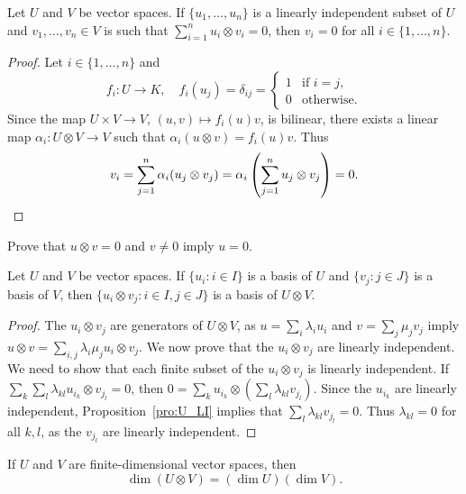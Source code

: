 \begin{proposition}
	\label{pro:U_LI}
	Let $U$ and $V$ be vector spaces. 
	If $\{u_1,\dots,u_n\}$ is a linearly independent subset of $U$ and 
	$v_1,\dots,v_n\in V$ is such that $\sum_{i=1}^n u_i\otimes v_i=0$, then 
    $v_i=0$ for all $i\in\{1,\dots,n\}$.
\end{proposition}

\begin{proof}
	Let $i\in\{1,\dots,n\}$ and 
	\[
	f_i\colon U\to K,
	\quad
	f_i(u_j)=\delta_{ij}=\begin{cases}
	1 & \text{if $i=j$},\\
	0 & \text{otherwise}.
	\end{cases}
	\]
	Since the map $U\times V\to V$, $(u,v)\mapsto f_i(u)v$, is bilinear, there exists 
	a linear map 
	$\alpha_i\colon U\otimes V\to V$ such that $\alpha_i(u\otimes
	v)=f_i(u)v$. Thus
	\[
		v_i=\sum_{j=1}^n\alpha_i(u_j\otimes v_j)=\alpha_i\left(\sum_{j=1}^nu_j\otimes v_j\right)=0.\qedhere
	\]
\end{proof}

\begin{exercise}
	\label{xca:uxv=0}
	Prove that $u\otimes v=0$ and $v\ne 0$ imply $u=0$.
\end{exercise}

\begin{theorem}
    Let $U$ and $V$ be vector spaces. 
	If $\{u_i:i\in I\}$ is a basis of $U$ and $\{v_j:j\in J\}$ is a basis of $V$, then 
	$\{u_i\otimes v_j:i\in I,j\in J\}$ is a basis of $U\otimes
	V$.
\end{theorem}

\begin{proof}
	The $u_i\otimes v_j$ are generators of $U\otimes V$, as  
    $u=\sum_i\lambda_iu_i$ and $v=\sum_j\mu_jv_j$ imply 
	$u\otimes v=\sum_{i,j}\lambda_i\mu_ju_i\otimes v_j$. 
	We now prove that the $u_i\otimes v_j$ are linearly independent. We need to show that
	each finite subset of the $u_i\otimes v_j$
	is linearly independent. If $\sum_k\sum_l\lambda_{kl}u_{i_k}\otimes
	v_{j_l}=0$, then 
	$0=\sum_{k}u_{i_k}\otimes\left(\sum_{l}\lambda_{kl}v_{j_l}\right)$. Since  
	the $u_{i_k}$ are linearly independent, Proposition~\ref{pro:U_LI}
	implies that $\sum_{l}\lambda_{kl}v_{j_l}=0$. Thus $\lambda_{kl}=0$ for all 
	$k,l$, as the $v_{j_l}$ are linearly independent. 
\end{proof}

If $U$ and $V$ are finite-dimensional vector spaces, then 
\[
	\dim(U\otimes V)=(\dim U)(\dim V).
\]

